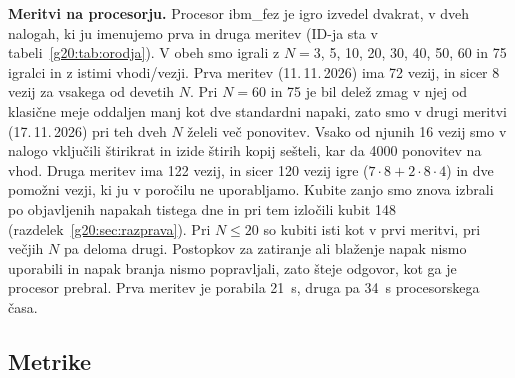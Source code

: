 \textbf{Meritvi na procesorju.} Procesor ibm\_fez je igro izvedel dvakrat, v dveh nalogah, ki ju imenujemo prva in druga meritev (ID-ja sta v tabeli~\ref{g20:tab:orodja}). V obeh smo igrali z $N=3$, 5, 10, 20, 30, 40, 50, 60 in 75 igralci in z istimi vhodi/vezji. Prva meritev (11.\,11.\,2026) ima 72 vezij, in sicer 8 vezij za vsakega od devetih $N$. Pri $N=60$ in 75 je bil delež zmag v njej od klasične meje oddaljen manj kot dve standardni napaki, zato smo v drugi meritvi (17.\,11.\,2026) pri teh dveh $N$ želeli več ponovitev. Vsako od njunih 16 vezij smo v nalogo vključili štirikrat in izide štirih kopij sešteli, kar da 4000 ponovitev na vhod. Druga meritev ima 122 vezij, in sicer 120 vezij igre ($7\cdot8+2\cdot8\cdot4$) in dve pomožni vezji, ki ju v poročilu ne uporabljamo. Kubite zanjo smo znova izbrali po objavljenih napakah tistega dne in pri tem izločili kubit 148 (razdelek~\ref{g20:sec:razprava}). Pri $N\le20$ so kubiti isti kot v prvi meritvi, pri večjih $N$ pa deloma drugi. Postopkov za zatiranje ali blaženje napak nismo uporabili in napak branja nismo popravljali, zato šteje odgovor, kot ga je procesor prebral. Prva meritev je porabila 21~s, druga pa 34~s procesorskega časa.

\subsection{Metrike}
\label{g20:sec:metrike}

